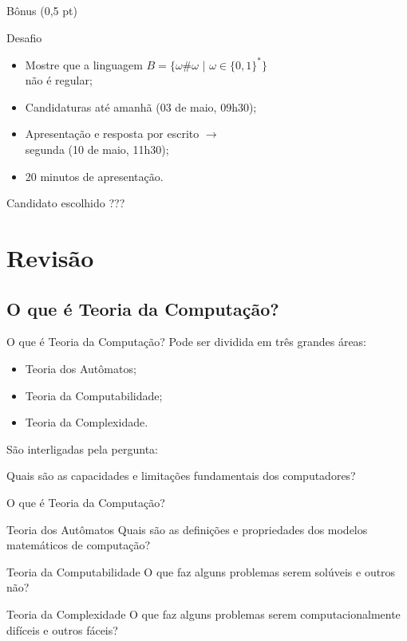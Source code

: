 \documentclass[xcolor=dvipsnames,table]{beamer}
\begin{document}
	\begin{frame}{Bônus (0,5 pt)}
		\begin{block}{Desafio}
			\begin{itemize}
				\item Mostre que a linguagem $B = \{ \omega \# \omega \mbox{ | } \omega \in \{ 0, 1 \}^* \}$ \\não é regular; 
                \item Candidaturas até amanhã (03 de maio, 09h30);
                \item Apresentação e resposta por escrito $\rightarrow$ \\segunda (10 de maio, 11h30); 
                \item 20 minutos de apresentação.
			\end{itemize}
		\end{block}
        \begin{block}{Candidato escolhido}
        	???
        \end{block}
	\end{frame}
    
    \section{Revisão}
	\subsection{O que é Teoria da Computação?}
	\begin{frame}{O que é Teoria da Computação?}
		Pode ser dividida em três grandes áreas:
		\begin{itemize}
			\item Teoria dos Autômatos;
			\item Teoria da Computabilidade;
			\item Teoria da Complexidade.	
		\end{itemize}
		São interligadas pela pergunta:
		\begin{block}{}
			Quais são as capacidades e limitações fundamentais dos computadores?
		\end{block}
	\end{frame}
	
	\begin{frame}{O que é Teoria da Computação?}
		\begin{block}{Teoria dos Autômatos}
			Quais são as definições e propriedades dos modelos matemáticos de computação?
		\end{block} 
		\begin{block}{Teoria da Computabilidade}
			O que faz alguns problemas serem solúveis e outros não?		
		\end{block} 
		\begin{block}{Teoria da Complexidade}
			O que faz alguns problemas serem computacionalmente difíceis e outros fáceis?
		\end{block}
	\end{frame}
	
\end{document}
